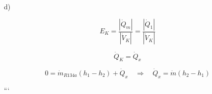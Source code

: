 d)

\[
E_K = \frac{\left| \dot{Q}_m \right|}{\left| \dot{V}_K \right|} = \frac{\left| \dot{Q}_1 \right|}{\left| \dot{V}_K \right|}
\]

\[
\dot{Q}_K = \dot{Q}_x
\]

\[
0 = \dot{m}_{R134a} \left( h_1 - h_2 \right) + \dot{Q}_x \quad \Rightarrow \quad \dot{Q}_x = \dot{m} \left( h_2 - h_1 \right)
\]

```